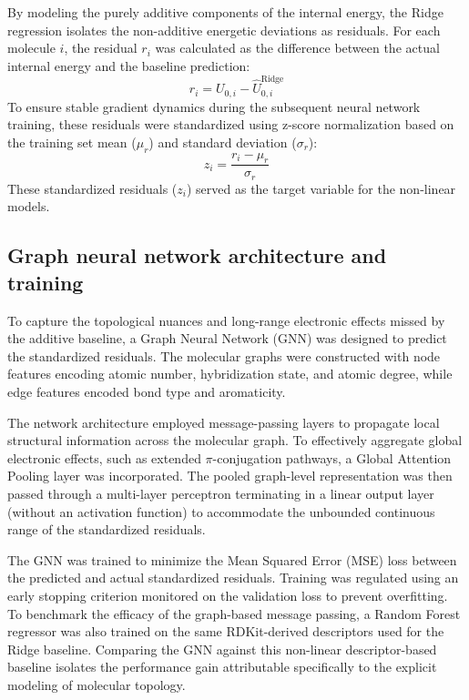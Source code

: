\documentclass[]{article}
\begin{document}
By modeling the purely additive components of the internal energy, the Ridge regression isolates the non-additive energetic deviations as residuals. For each molecule $i$, the residual $r_i$ was calculated as the difference between the actual internal energy and the baseline prediction:
\begin{equation}
    r_i = U_{0,i} - \hat{U}_{0,i}^{\text{Ridge}}
\end{equation}
To ensure stable gradient dynamics during the subsequent neural network training, these residuals were standardized using z-score normalization based on the training set mean ($\mu_r$) and standard deviation ($\sigma_r$):
\begin{equation}
    z_i = \frac{r_i - \mu_r}{\sigma_r}
\end{equation}
These standardized residuals ($z_i$) served as the target variable for the non-linear models.

\subsection{Graph neural network architecture and training}
To capture the topological nuances and long-range electronic effects missed by the additive baseline, a Graph Neural Network (GNN) was designed to predict the standardized residuals. The molecular graphs were constructed with node features encoding atomic number, hybridization state, and atomic degree, while edge features encoded bond type and aromaticity. 

The network architecture employed message-passing layers to propagate local structural information across the molecular graph. To effectively aggregate global electronic effects, such as extended $\pi$-conjugation pathways, a Global Attention Pooling layer was incorporated. The pooled graph-level representation was then passed through a multi-layer perceptron terminating in a linear output layer (without an activation function) to accommodate the unbounded continuous range of the standardized residuals.

The GNN was trained to minimize the Mean Squared Error (MSE) loss between the predicted and actual standardized residuals. Training was regulated using an early stopping criterion monitored on the validation loss to prevent overfitting. To benchmark the efficacy of the graph-based message passing, a Random Forest regressor was also trained on the same RDKit-derived descriptors used for the Ridge baseline. Comparing the GNN against this non-linear descriptor-based baseline isolates the performance gain attributable specifically to the explicit modeling of molecular topology.
\end{document}

